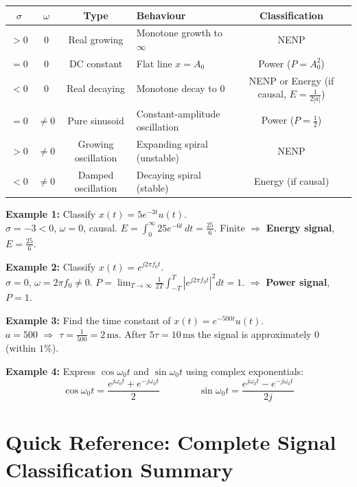 \documentclass[10pt,a4paper]{article}
\begin{document}
\begin{center}
{\small
\begin{tabular}{@{}cc c p{4.5cm} c@{}}
\toprule
$\sigma$ & $\omega$ & Type & Behaviour & Classification \\
\midrule
$>0$ & $0$ & Real growing & Monotone growth to $\infty$ & NENP \\
$=0$ & $0$ & DC constant & Flat line $x=A_0$ & Power ($P=A_0^2$) \\
$<0$ & $0$ & Real decaying & Monotone decay to $0$ & NENP or Energy (if causal, $E=\tfrac{1}{2|a|}$) \\
$=0$ & $\neq0$ & Pure sinusoid & Constant-amplitude oscillation & Power ($P=\tfrac{1}{2}$) \\
$>0$ & $\neq0$ & Growing oscillation & Expanding spiral (unstable) & NENP \\
$<0$ & $\neq0$ & Damped oscillation & Decaying spiral (stable) & Energy (if causal) \\
\bottomrule
\end{tabular}
}
\end{center}

\begin{exbox}
\textbf{Example 1:} Classify $x(t) = 5e^{-3t}u(t)$.\\
$\sigma=-3<0$, $\omega=0$, causal. $E=\int_0^\infty 25e^{-6t}\,dt=\tfrac{25}{6}$. Finite $\Rightarrow$ \textbf{Energy signal}, $E=\tfrac{25}{6}$.

\medskip
\textbf{Example 2:} Classify $x(t)=e^{j2\pi f_0 t}$.\\
$\sigma=0$, $\omega=2\pi f_0\neq0$. $P=\lim_{T\to\infty}\tfrac{1}{2T}\int_{-T}^{T}|e^{j2\pi f_0t}|^2dt=1$. $\Rightarrow$ \textbf{Power signal}, $P=1$.

\medskip
\textbf{Example 3:} Find the time constant of $x(t)=e^{-500t}u(t)$.\\
$a=500$ $\Rightarrow$ $\tau=\tfrac{1}{500}=2\,\mathrm{ms}$. After $5\tau=10\,\mathrm{ms}$ the signal is approximately $0$ (within $1\%$).

\medskip
\textbf{Example 4:} Express $\cos\omega_0 t$ and $\sin\omega_0 t$ using complex exponentials:
\[
  \cos\omega_0 t = \frac{e^{j\omega_0 t}+e^{-j\omega_0 t}}{2} \qquad\qquad \sin\omega_0 t = \frac{e^{j\omega_0 t}-e^{-j\omega_0 t}}{2j}
\]
\end{exbox}

\section{Quick Reference: Complete Signal Classification Summary}
\end{document}
